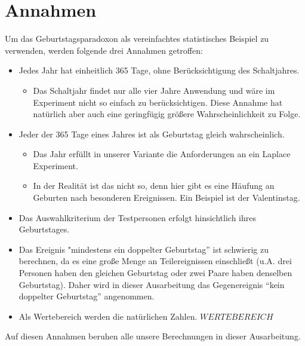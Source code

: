 \documentclass[11pt]{article}
\begin{document}
    \section{Annahmen}

    Um das Geburtstagsparadoxon als vereinfachtes statistisches Beispiel zu verwenden, werden folgende drei Annahmen getroffen:

    \begin{itemize}
        \item Jedes Jahr hat einheitlich 365 Tage, ohne Berücksichtigung des Schaltjahres.
        \begin{itemize}
            \item Das Schaltjahr findet nur alle vier Jahre Anwendung und wäre im Experiment nicht so einfach zu berücksichtigen. Diese Annahme hat natürlich aber auch eine geringfügig größere Wahrscheinlichkeit zu Folge.
        \end{itemize}
    \end{itemize}

    \begin{itemize}
        \item Jeder der 365 Tage eines Jahres ist als Geburtstag gleich wahrscheinlich.

        \begin{itemize}
            \item Das Jahr erfüllt in unserer Variante die Anforderungen an ein Laplace Experiment.
        \end{itemize}

        \begin{itemize}
            \item In der Realität ist das nicht so, denn hier gibt es eine Häufung an Geburten nach besonderen Ereignissen. Ein Beispiel ist der Valentinstag.
        \end{itemize}

    \end{itemize}

    \begin{itemize}
        \item Das Auswahlkriterium der Testpersonen erfolgt hinsichtlich ihres Geburtstages.
    \end{itemize}

    \begin{itemize}
        \item Das Ereignis "mindestens ein doppelter Geburtstag” ist schwierig zu berechnen, da es eine große Menge an Teilereignissen einschließt (u.A. drei Personen haben den gleichen Geburtstag oder zwei Paare haben denselben Geburtstag). Daher wird in dieser Ausarbeitung das Gegenereignis “kein doppelter Geburtstag” angenommen.
    \end{itemize}

    \begin{itemize}
        \item Als Wertebereich werden die natürlichen Zahlen. \(WERTEBEREICH\)
    \end{itemize}

Auf diesen Annahmen beruhen alle unsere Berechnungen in dieser Ausarbeitung.
\end{document}
